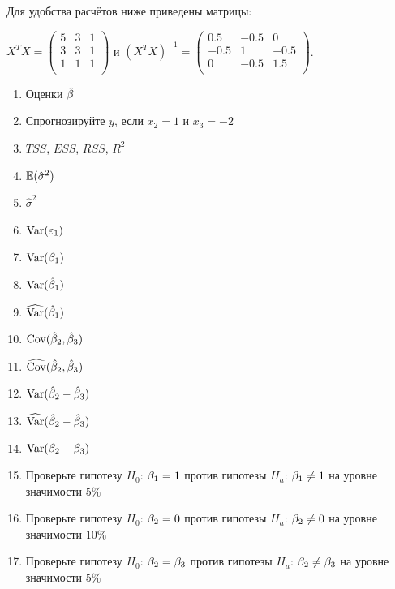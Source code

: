 \documentclass[12pt, a4paper]{article}
\begin{document}
Для удобства расчётов ниже приведены матрицы:

$X^T X =  \begin{pmatrix}
5 & 3 & 1 \\
3 & 3 & 1 \\
1 & 1 & 1 \\
\end{pmatrix} $ и $(X^T X)^{-1} =  \begin{pmatrix}
0.5 & -0.5 & 0 \\
-0.5 & 1 & -0.5 \\
0 & -0.5 & 1.5 \\
\end{pmatrix} $.

\begin{enumerate}
\item Оценки $\hat{\beta}$
\item Спрогнозируйте $y$, если  $x_2=1$ и $x_3=-2$
\item $TSS$, $ESS$, $RSS$, $R^2$
\item $\mathbb{E} (\hat{\sigma}^2)$
\item $\hat{\sigma}^2$
\item $\operatorname{Var} (\varepsilon_1)$
\item $\operatorname{Var} (\beta_1)$
\item $\operatorname{Var} (\hat{\beta}_1)$
\item $\widehat{\operatorname{Var} }(\hat{\beta}_1)$
\item $\operatorname{Cov} (\hat{\beta}_2, \hat{\beta}_3)$
\item $\widehat{\operatorname{Cov} }(\hat{\beta}_2, \hat{\beta}_3)$
\item $\operatorname{Var} (\hat{\beta}_2 - \hat{\beta}_3)$
\item $\widehat{\operatorname{Var} }(\hat{\beta}_2 - \hat{\beta}_3)$
\item $\operatorname{Var} (\beta_2 - \beta_3)$
\item Проверьте гипотезу $H_0$: $\beta_1=1$ против гипотезы $H_a$: $\beta_1\neq 1$ на уровне значимости $5\%$
\item Проверьте гипотезу $H_0$: $\beta_2=0$ против гипотезы $H_a$: $\beta_2\neq 0$ на уровне значимости $10\%$
\item Проверьте гипотезу $H_0$: $\beta_2=\beta_3$ против гипотезы $H_a$: $\beta_2\neq \beta_3$ на уровне значимости $5\%$
\end{enumerate}
\end{document}
